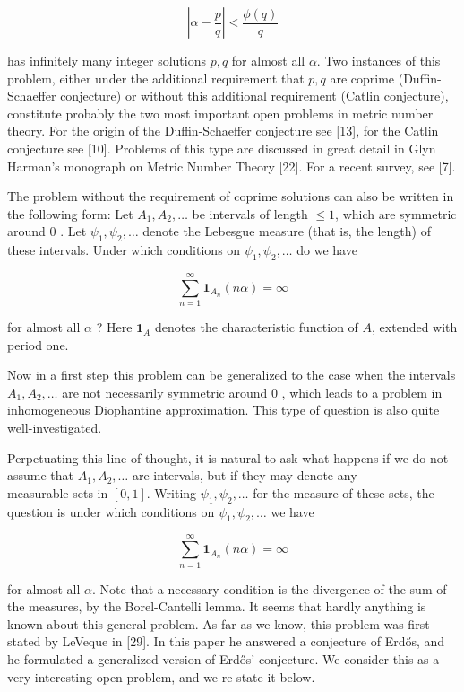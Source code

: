 \documentclass[10pt]{article}
\begin{document}
$$
\left|\alpha-\frac{p}{q}\right|<\frac{\phi(q)}{q}
$$

has infinitely many integer solutions $p, q$ for almost all $\alpha$. Two instances of this problem, either under the additional requirement that $p, q$ are coprime (Duffin-Schaeffer conjecture) or without this additional requirement (Catlin conjecture), constitute probably the two most important open problems in metric number theory. For the origin of the Duffin-Schaeffer conjecture see [13], for the Catlin conjecture see [10]. Problems of this type are discussed in great detail in Glyn Harman's monograph on Metric Number Theory [22]. For a recent survey, see [7].

The problem without the requirement of coprime solutions can also be written in the following form: Let $A_{1}, A_{2}, \ldots$ be intervals of length $\leqslant 1$, which are symmetric around 0 . Let $\psi_{1}, \psi_{2}, \ldots$ denote the Lebesgue measure (that is, the length) of these intervals. Under which conditions on $\psi_{1}, \psi_{2}, \ldots$ do we have

$$
\sum_{n=1}^{\infty} \mathbf{1}_{A_{n}}(n \alpha)=\infty
$$

for almost all $\alpha$ ? Here $\mathbf{1}_{A}$ denotes the characteristic function of $A$, extended with period one.

Now in a first step this problem can be generalized to the case when the intervals $A_{1}, A_{2}, \ldots$ are not necessarily symmetric around 0 , which leads to a problem in inhomogeneous Diophantine approximation. This type of question is also quite well-investigated.

Perpetuating this line of thought, it is natural to ask what happens if we do not assume that $A_{1}, A_{2}, \ldots$ are intervals, but if they may denote any\\
measurable sets in $[0,1]$. Writing $\psi_{1}, \psi_{2}, \ldots$ for the measure of these sets, the question is under which conditions on $\psi_{1}, \psi_{2}, \ldots$ we have

$$
\sum_{n=1}^{\infty} \mathbf{1}_{A_{n}}(n \alpha)=\infty
$$

for almost all $\alpha$. Note that a necessary condition is the divergence of the sum of the measures, by the Borel-Cantelli lemma. It seems that hardly anything is known about this general problem. As far as we know, this problem was first stated by LeVeque in [29]. In this paper he answered a conjecture of Erdős, and he formulated a generalized version of Erdős' conjecture. We consider this as a very interesting open problem, and we re-state it below.
\end{document}
